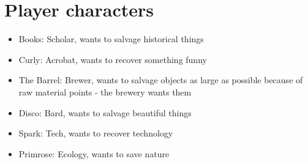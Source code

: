 \section{Player characters}

\begin{itemize}
\item Books: Scholar, wants to salvage historical things
\item Curly: Acrobat, wants to recover something funny
\item The Barrel: Brewer, wants to salvage objects as large as possible because of raw material points - the brewery wants them
\item Disco: Bard, wants to salvage beautiful things
\item Spark: Tech, wants to recover technology
\item Primrose: Ecology, wants to save nature
\end{itemize}



